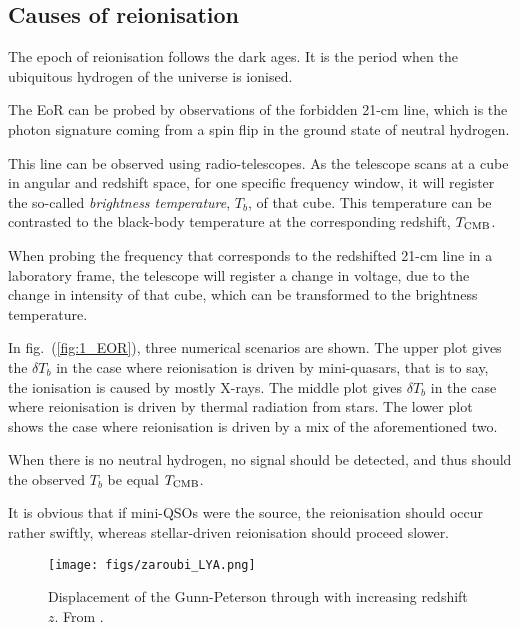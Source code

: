 \documentclass[ignorenonframetext]{beamer}
\begin{document}
\subsection{Causes of reionisation}
The epoch of reionisation follows the dark ages. It is the period when the ubiquitous hydrogen of the universe is ionised.

The EoR can be probed by observations of the forbidden 21-cm line, which is the photon signature coming from a spin flip in the ground state of neutral hydrogen. 

This line can be observed using radio-telescopes. As the telescope scans at a cube in angular and redshift space, for one specific frequency window, it will register the so-called \textit{brightness temperature}, $T_b$, of that cube. This temperature can be contrasted to the black-body temperature at the corresponding redshift, $T_{\rm CMB}$. 

When probing the frequency that corresponds to the redshifted 21-cm line in a laboratory frame, the telescope will register a change in voltage, due to the change in intensity of that cube, which can be transformed to the brightness temperature. 

In fig.~(\ref{fig:1_EOR}), three numerical scenarios are shown. The upper plot gives the $\delta T_b$ in the case where reionisation is driven by mini-quasars, that is to say, the ionisation is caused by mostly X-rays. The middle plot gives $\delta T_b$ in the case where reionisation is driven by thermal radiation from stars. The lower plot shows the case where reionisation is driven by a mix of the aforementioned two.

When there is no neutral hydrogen, no signal should be detected, and thus should the observed $T_b$ be equal $T_{\rm CMB}$. 

It is obvious that if mini-QSOs were the source, the reionisation should occur rather swiftly, whereas stellar-driven reionisation should proceed slower.

\begin{frame}
    \begin{figure}[htb]
        \centering
        \texttt{[image: figs/zaroubi\_LYA.png]}
        \caption{Displacement of the Gunn-Peterson through with increasing redshift $z$. From .}
        \label{fig:2_LYA}
    \end{figure}

\end{frame}
\end{document}
